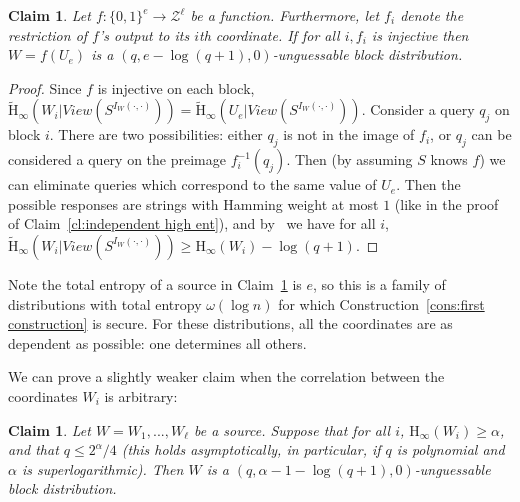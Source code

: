 \documentclass[11pt]{article}
\newcommand{\clref}[1]{\mbox{Claim~\ref{#1}}}
\newcommand{\consref}[1]{\mbox{Construction~\ref{#1}}}
\newcommand{\zo}{\ensuremath{\{0, 1\}}}
\newcommand{\Hoo}{\mathrm{H}_\infty}
\newcommand{\Hav}{\tilde{\mathrm{H}}_\infty}
\newtheorem{claim}[theorem]{Claim}
\begin{document}
\begin{claim}
\label{cl:each block from single seed}
Let $f:\zo^e \rightarrow \mathcal{Z}^\ell$ be a function.  Furthermore, let $f_i$ denote the restriction of $f$'s output to its $i$th coordinate.  If for all $i, f_i$ is injective then $W = f(U_e)$ is a $( q, e - \log (q+1), 0)$-unguessable block distribution.
\end{claim}
\begin{proof}
Since $f$ is injective on each block, $\Hav(W_i | View(S^{I_{W}(\cdot, \cdot)})) = \Hav(U_e | View(S^{I_{W}(\cdot, \cdot)}))$.  Consider a query $q_j$ on block $i$.  There are two possibilities: either $q_j$ is not in the image of $f_i$,  or $q_j$ can be considered a query on the preimage $f_i^{-1}(q_j)$. Then (by assuming $S$ knows $f$) we can eliminate queries which correspond to the same value of $U_e$.  Then the possible responses are strings with Hamming weight at most $1$ (like in the
proof of \clref{cl:independent high ent}),
 and by~\cite[Lemma 2.2]{DBLP:journals/siamcomp/DodisORS08} we have for all $i$, $\Hav(W_i | View(S^{I_{W}(\cdot, \cdot)})) \geq \Hoo(W_i) -\log (q+1)$.
\end{proof}

Note the total entropy of a source in \clref{cl:each block from single seed} is $e$, so this is a family of distributions with total entropy $\omega(\log n)$ for which \consref{cons:first construction} is secure.  For these distributions, all the coordinates are as dependent as possible: one determines all others.

We can prove a slightly weaker claim when the correlation between the coordinates $W_i$ is arbitrary:

\begin{claim}
\label{cl:all blocks entropy}
Let $W = W_1,..., W_\ell$ be a source.  Suppose that for all $i$, $\Hoo(W_i)\geq \alpha$, and that $q \le 2^{\alpha}/4$ (this holds asymptotically, in particular, if $q$ is polynomial and $\alpha$ is superlogarithmic). Then  $W$ is a $(q, \alpha-1-\log(q+1), 0)$-unguessable block distribution.
\end{claim}
\end{document}

